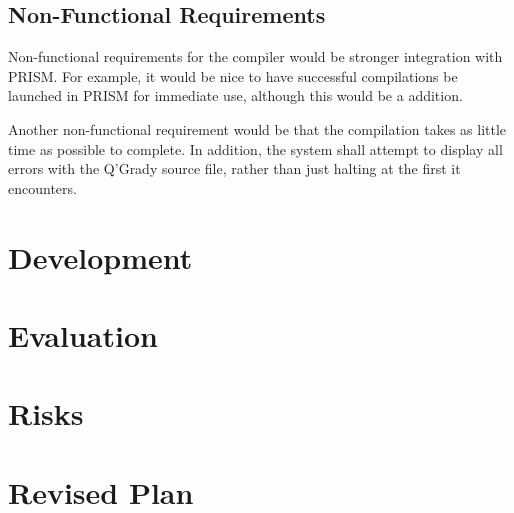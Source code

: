 \documentclass[11pt, a4paper]{article}
\begin{document}
\subsection{Non-Functional Requirements} %
\label{sub:non_functional_requirements}
Non-functional requirements for the compiler would be stronger integration with
PRISM. For example, it would be nice to have successful compilations be launched
in PRISM for immediate use, although this would be a addition.

Another non-functional requirement would be that the compilation takes as little
time as possible to complete. In addition, the system shall attempt to display
all errors with the Q'Grady source file, rather than just halting at the first
it encounters.


\section{Development} %
\label{sec:development_process}



\section{Evaluation} %
\label{sec:evaluation}



\section{Risks} %
\label{sec:risks}



\section{Revised Plan} %
\label{sec:revised_plan}

\end{document}
